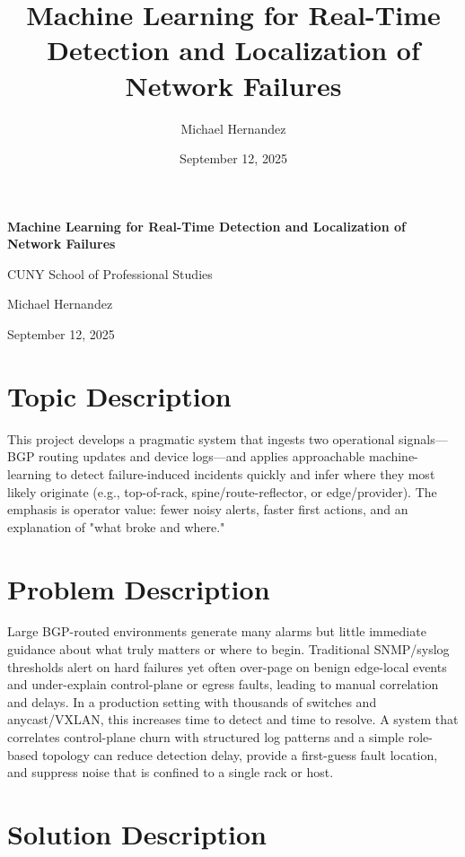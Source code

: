 \documentclass[11pt,letterpaper]{article}
\title{Machine Learning for Real-Time Detection and Localization of Network Failures}
\author{Michael Hernandez}
\date{September 12, 2025}
\begin{document}
\begin{titlepage}
    \centering
    \vspace*{2in}
    {\LARGE \textbf{Machine Learning for Real-Time Detection and Localization of Network Failures}}
    
    \vspace{1in}
    {\large CUNY School of Professional Studies}
    
    \vspace{0.5in}
    {\large Michael Hernandez}
    
    \vspace{0.5in}
    {\large September 12, 2025}
    
    \vfill
\end{titlepage}

\setcounter{page}{1}

\section{Topic Description}

This project develops a pragmatic system that ingests two operational signals—BGP routing updates and device logs—and applies approachable machine-learning to detect failure-induced incidents quickly and infer where they most likely originate (e.g., top-of-rack, spine/route-reflector, or edge/provider). The emphasis is operator value: fewer noisy alerts, faster first actions, and an explanation of "what broke and where."

\section{Problem Description}

Large BGP-routed environments generate many alarms but little immediate guidance about what truly matters or where to begin. Traditional SNMP/syslog thresholds alert on hard failures yet often over-page on benign edge-local events and under-explain control-plane or egress faults, leading to manual correlation and delays. In a production setting with thousands of switches and anycast/VXLAN, this increases time to detect and time to resolve. A system that correlates control-plane churn with structured log patterns and a simple role-based topology can reduce detection delay, provide a first-guess fault location, and suppress noise that is confined to a single rack or host.

\section{Solution Description}
\end{document}
